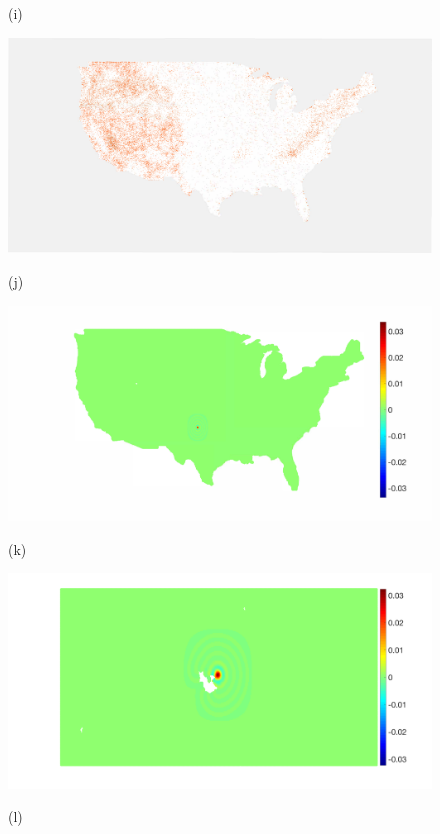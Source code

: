\documentclass[journal, 10pt]{IEEEtran}
\begin{document}
\begin{figure}[tb]
\begin{minipage}[m]{0.24\linewidth}
\centerline{\small{(i)}}
\end{minipage}%
\begin{minipage}[m]{0.24\linewidth}
\centerline{\includegraphics[width=.84\linewidth]{fig_temp_selected_b2_adapted}}
\centerline{\small{(j)}}
\end{minipage}
\begin{minipage}[m]{0.24\linewidth}
\centerline{\includegraphics[width=.9\linewidth]{fig_temp_scaling}}
\centerline{\small{(k)}} 
\end{minipage} 
\begin{minipage}[m]{0.24\linewidth}
\centerline{\includegraphics[width=.9\linewidth]{fig_temp_scaling_zoom}}
\centerline{\small{(l)}}
\end{minipage} \medskip \\

\end{figure}
\end{document}
